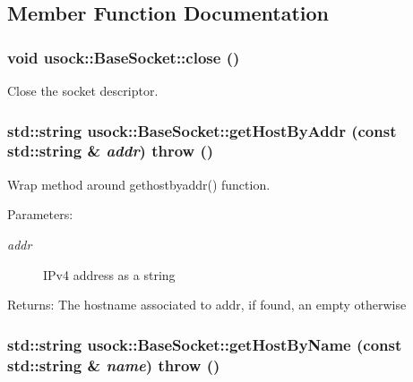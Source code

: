 \subsection{Member Function Documentation}
\hypertarget{classusock_1_1BaseSocket_06383c7ad352244fb0e5e6276e5e86c2}{
\subsubsection[{close}]{\setlength{\rightskip}{0pt plus 5cm}void usock::BaseSocket::close ()}}
\label{classusock_1_1BaseSocket_06383c7ad352244fb0e5e6276e5e86c2}


Close the socket descriptor. 

\hypertarget{classusock_1_1BaseSocket_b0fdf738e659b1d7088611bd4b4c9b67}{
\subsubsection[{getHostByAddr}]{\setlength{\rightskip}{0pt plus 5cm}std::string usock::BaseSocket::getHostByAddr (const std::string \& {\em addr})  throw ()}}
\label{classusock_1_1BaseSocket_b0fdf738e659b1d7088611bd4b4c9b67}


Wrap method around gethostbyaddr() function. 

\begin{Desc}
\item[Parameters:]
\begin{description}
\item[{\em addr}]IPv4 address as a string \end{description}
\end{Desc}
\begin{Desc}
\item[Returns:]The hostname associated to addr, if found, an empty otherwise \end{Desc}
\hypertarget{classusock_1_1BaseSocket_7ffc3a11be4a9d7ba72a1f66f3dbad68}{
\subsubsection[{getHostByName}]{\setlength{\rightskip}{0pt plus 5cm}std::string usock::BaseSocket::getHostByName (const std::string \& {\em name})  throw ()}}
\label{classusock_1_1BaseSocket_7ffc3a11be4a9d7ba72a1f66f3dbad68}



